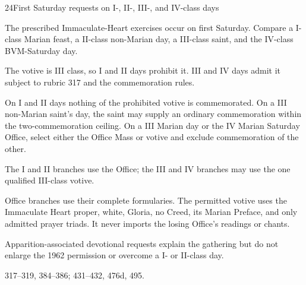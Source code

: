 \begin{casefile}{24}{First Saturday requests on I-, II-, III-, and IV-class days}
\item[Calendar facts] The prescribed Immaculate-Heart exercises occur on first Saturday.  Compare a I-class Marian feast, a II-class non-Marian day, a III-class saint, and the IV-class BVM-Saturday day.
\item[Ranks and rows] The votive is III class, so I and II days prohibit it.  III and IV days admit it subject to rubric 317 and the commemoration rules.
\item[Impeded item] On I and II days nothing of the prohibited votive is commemorated.  On a III non-Marian saint's day, the saint may supply an ordinary commemoration within the two-commemoration ceiling.  On a III Marian day or the IV Marian Saturday Office, select either the Office Mass or votive and exclude commemoration of the other.
\item[Mass category] The I and II branches use the Office; the III and IV branches may use the one qualified III-class votive.
\item[Assembly] Office branches use their complete formularies.  The permitted votive uses the Immaculate Heart proper, white, Gloria, no Creed, its Marian Preface, and only admitted prayer triads.  It never imports the losing Office's readings or chants.
\item[Boundary] Apparition-associated devotional requests explain the gathering but do not enlarge the 1962 permission or overcome a I- or II-class day.
\item[Rubric locus] 317--319, 384--386; 431--432, 476d, 495.
\end{casefile}

